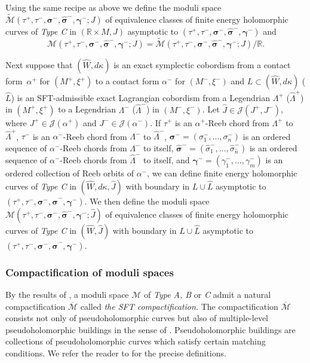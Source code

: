 \documentclass[JEP,XML,SOM,Unicode,NoFloatCountersInSection]{cedram}
\let\mathcal\mathscr
\theoremstyle{plain}
\theoremstyle{definition}
\numberwithin{equation}{subsection}
\newcommand{\RR}{\mathbb{R}}
\let\bs\boldsymbol
\begin{document}
Using the same recipe as above we define the moduli space $\widetilde{\mathcal{M}}(\tau^+\!,\tau^-\!,\bs\sigma^-\!,\widehat{\bs\sigma}^-\!,\bs\gamma^-;J)$ of equivalence classes of finite energy holomorphic curves of \emph{Type C} in $(\mathbb{R}\times M,J)$ asymptotic to $(\tau^+,\tau^-,\bs\sigma^-,\widehat{\bs\sigma}^-,\bs\gamma^-)$ and $${\mathcal{M}}(\tau^+,\tau^-,\bs\sigma^-,\widehat{\bs\sigma}^-,\bs\gamma^-;J)=\widetilde{\mathcal{M}}(\tau^+,\tau^-,\bs\sigma^-,\widehat{\bs\sigma}^-,\bs\gamma^-;J)/\RR.$$

Next suppose that $(\widehat W, d\kappa)$ is an exact symplectic cobordism from a contact form~$\alpha^+$ for $(M^+,\xi^+)$ to a contact form $\alpha^-$ for $(M^-,\xi^-)$ and $L \subset (\widehat W,d\kappa)$ (\resp $\widehat L$) is an SFT-admissible exact Lagrangian cobordism from a Legendrian $\Lambda^+$ (\resp $\widehat{\Lambda}^+$) in $(M^+,\xi^+)$ to a Legendrian $\Lambda^-$ (\resp $\widehat{\Lambda}^-$) in $(M^-,\xi^-)$. Let $\widehat{J}\in \mathcal{J}(J^+,J^-)$, where $J^+ \in \mathcal{J}(\alpha^+)$ and $J^- \in \mathcal{J}(\alpha^-)$. If $\tau^+$ is an $\alpha^+$-Reeb chord from $\Lambda^+$ to $\widehat{\Lambda}^+$, $\tau^-$ is an $\alpha^-$-Reeb chord from $\Lambda^-$ to $\widehat{\Lambda}^-$, $\bs\sigma^-=(\sigma^-_1,\dots,\sigma^-_n)$ is an ordered sequence of $\alpha^-$-Reeb chords from $\Lambda^-$ to itself, $\widehat{\bs\sigma}^-=(\widehat{\sigma}^-_1,\dots,\widehat{\sigma}^-_{\widehat{n}})$ is an ordered sequence of $\alpha^-$-Reeb chords from $\widehat{\Lambda}^-$ to itself, and $\bs\gamma^-=(\gamma^-_1,\dots,\gamma^-_m)$ is an ordered collection of Reeb orbits of $\alpha^-$, we can define finite energy holomorphic curves of \emph{Type C} in $(\widehat W,d\kappa, \widehat{J})$ with boundary in $L\cup \widehat{L}$ asymptotic to $(\tau^+,\tau^-,\bs\sigma^-,\widehat{\bs\sigma}^-,\bs\gamma^-)$.
We then define the moduli space ${\mathcal{M}}(\tau^+,\tau^-,\bs\sigma^-,\widehat{\bs\sigma}^-,\bs\gamma^-;\widehat{J})$ of equivalence classes of finite energy holomorphic curves of \emph{Type C} in $(\widehat W,\widehat{J})$ with boundary in $L\cup \widehat{L}$ asymptotic to $(\tau^+,\tau^-,\bs\sigma^-,\widehat{\bs\sigma}^-,\bs\gamma^-)$.

\subsubsection{Compactification of moduli spaces}

By the results of \cite{CPT}, a moduli space $\mathcal{M}$ of \emph{Type A, B} or \emph{C} admit a natural compactification $\overline{\mathcal{M}}$ called {\em the SFT compactification.} The compactification $\overline{\mathcal{M}}$ consists not only of pseudoholomorphic curves but also of multiple-level pseudoholomorphic buildings in the sense of \cite{CPT}. Pseudoholomorphic buildings are collections of pseudoholomorphic curves which satisfy certain matching conditions. We refer the reader to \cite{CPT} for the precise definitions.
\end{document}
